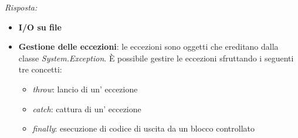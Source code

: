 \documentclass{article}
\newenvironment{solution}
    {\textit{Risposta:}}
    {}
\begin{document}
\begin{solution}
\begin{itemize}
	\item \textbf{I/O su file}
	\item \textbf{Gestione delle eccezioni}: le eccezioni sono oggetti che ereditano dalla classe \textit{System.Exception}.
	\newline
	È possibile gestire le eccezioni sfruttando i seguenti tre concetti:
	\begin{itemize}
		\item \textit{throw}: lancio di un' eccezione
		\item \textit{catch}: cattura di un' eccezione
		\item \textit{finally}: esecuzione di codice di uscita da un blocco controllato
	\end{itemize}
\end{itemize}
\end{solution}
\end{document}
